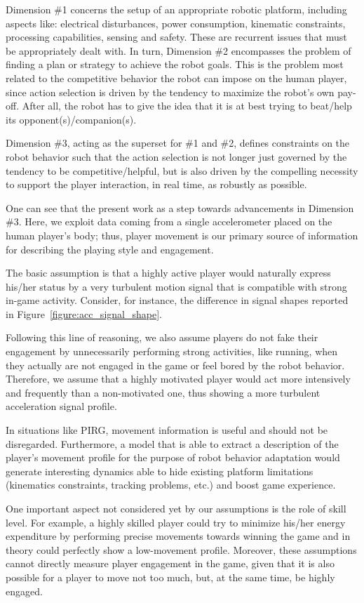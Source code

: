 Dimension \#1 concerns the setup of an appropriate robotic platform, including aspects like: electrical disturbances, power consumption, kinematic constraints, processing capabilities, sensing and safety. These are recurrent issues that must be appropriately dealt with. In turn, Dimension \#2 encompasses the problem of finding a plan or strategy to achieve the robot goals. This is the problem most related to the competitive behavior the robot can impose on the human player, since action selection is driven by the tendency to maximize the robot's own pay-off. After all, the robot has to give the idea that it is at best trying to beat/help its opponent(s)/companion(s).

Dimension \#3, acting as the superset for \#1 and \#2, defines constraints on the robot behavior such that the action selection is not longer just governed by the tendency to be competitive/helpful, but is also driven by the compelling necessity to support the player interaction, in real time, as robustly as possible.

One can see that the present work as a step towards advancements in Dimension \#3. Here, we exploit data coming from a single accelerometer placed on the human player's body; thus, player movement is our primary source of information for describing the playing style and engagement. 

The basic assumption is that a highly active player would naturally express his/her status by a very turbulent motion signal that is compatible with strong in-game activity. Consider, for instance, the difference in signal shapes reported in Figure~\ref{figure:acc_signal_shape}.

Following this line of reasoning, we also assume players do not fake their engagement by unnecessarily performing strong activities, like running, when they actually are not engaged in the game or feel bored by the robot behavior. Therefore, we assume that a highly motivated player would act more intensively and frequently than a non-motivated one, thus showing a more turbulent acceleration signal profile.

In situations like PIRG, movement information is useful and should not be disregarded. Furthermore, a model that is able to extract a description of the player's movement profile for the purpose of robot behavior adaptation would generate interesting dynamics able to hide existing platform limitations (kinematics constraints, tracking problems, etc.) and boost game experience.

One important aspect not considered yet by our assumptions is the role of skill level. For example, a highly skilled player could try to minimize his/her energy expenditure by performing precise movements towards winning the game and in theory could perfectly show a low-movement profile. Moreover, these assumptions cannot directly measure player engagement in the game, given that it is also possible for a player to move not too much, but, at the same time, be highly engaged. 

